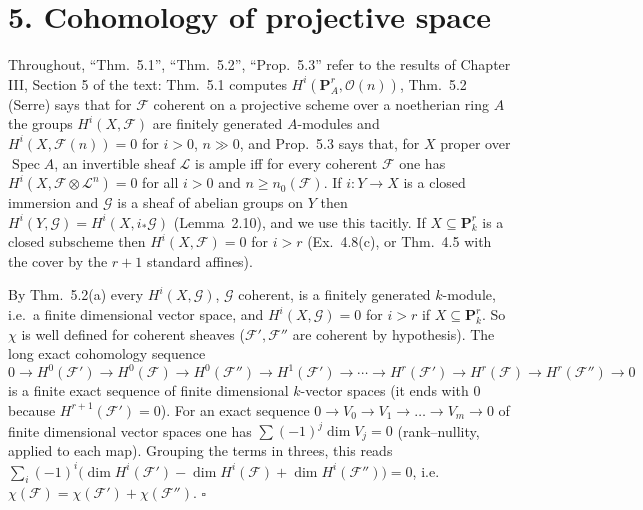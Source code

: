 \documentclass[11pt]{article}
\begin{document}
\section*{5. Cohomology of projective space}

Throughout, ``Thm.~5.1'', ``Thm.~5.2'', ``Prop.~5.3'' refer to the results of Chapter III, Section 5 of the text: Thm.~5.1 computes $H^i(\mathbf P^r_A,\mathcal O(n))$, Thm.~5.2 (Serre) says that for $\mathcal F$ coherent on a projective scheme over a noetherian ring $A$ the groups $H^i(X,\mathcal F)$ are finitely generated $A$-modules and $H^i(X,\mathcal F(n))=0$ for $i>0$, $n\gg0$, and Prop.~5.3 says that, for $X$ proper over $\operatorname{Spec}A$, an invertible sheaf $\mathcal L$ is ample iff for every coherent $\mathcal F$ one has $H^i(X,\mathcal F\otimes\mathcal L^n)=0$ for all $i>0$ and $n\ge n_0(\mathcal F)$. If $i\colon Y\to X$ is a closed immersion and $\mathcal G$ is a sheaf of abelian groups on $Y$ then $H^i(Y,\mathcal G)=H^i(X,i_*\mathcal G)$ (Lemma~2.10), and we use this tacitly. If $X\subseteq\mathbf P^r_k$ is a closed subscheme then $H^i(X,\mathcal F)=0$ for $i>r$ (Ex.~4.8(c), or Thm.~4.5 with the cover by the $r+1$ standard affines).

\pf
By Thm.~5.2(a) every $H^i(X,\mathcal G)$, $\mathcal G$ coherent, is a finitely generated $k$-module, i.e.\ a finite dimensional vector space, and $H^i(X,\mathcal G)=0$ for $i>r$ if $X\subseteq\mathbf P^r_k$. So $\chi$ is well defined for coherent sheaves ($\mathcal F',\mathcal F''$ are coherent by hypothesis). The long exact cohomology sequence
\[
0\to H^0(\mathcal F')\to H^0(\mathcal F)\to H^0(\mathcal F'')\to H^1(\mathcal F')\to\cdots\to H^r(\mathcal F')\to H^r(\mathcal F)\to H^r(\mathcal F'')\to0
\]
is a finite exact sequence of finite dimensional $k$-vector spaces (it ends with $0$ because $H^{r+1}(\mathcal F')=0$). For an exact sequence $0\to V_0\to V_1\to\dots\to V_m\to0$ of finite dimensional vector spaces one has $\sum(-1)^j\dim V_j=0$ (rank--nullity, applied to each map). Grouping the terms in threes, this reads $\sum_i(-1)^i\bigl(\dim H^i(\mathcal F')-\dim H^i(\mathcal F)+\dim H^i(\mathcal F'')\bigr)=0$, i.e.\ $\chi(\mathcal F)=\chi(\mathcal F')+\chi(\mathcal F'')$. \hfill$\square$
\end{document}
